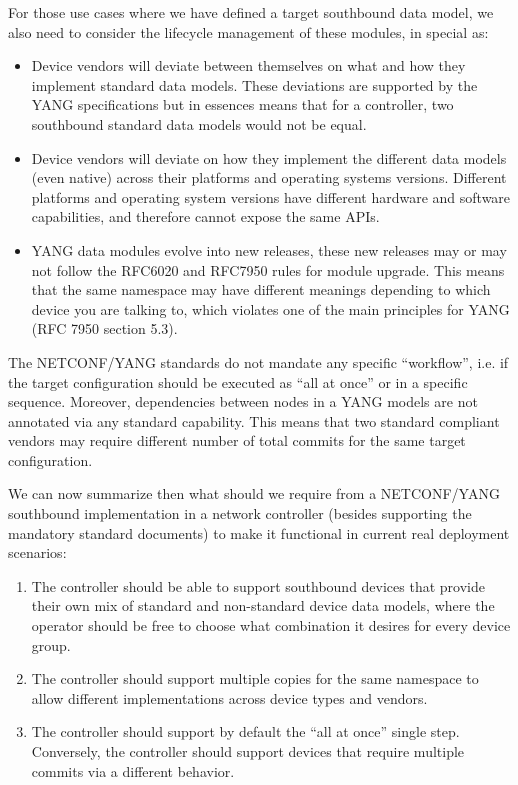 \documentclass[conference]{IEEEtran}
\begin{document}
For those use cases where we have defined a target southbound data model, we also need to consider the lifecycle management of these modules, in special as:
\begin{itemize}

\item Device vendors will deviate between themselves on what and how they implement standard data models. These deviations are supported by the YANG specifications but in essences means that for a controller, two southbound standard data models would not be equal. 

\item Device vendors will deviate on how they implement the different data models (even native) across their platforms and operating systems versions. Different platforms and operating system versions have different hardware and software capabilities, and therefore cannot expose the same APIs.

\item YANG data modules evolve into new releases, these new releases may or may not follow the RFC6020 and RFC7950 rules for module upgrade. This means that the same namespace may have different meanings depending to which device you are talking to, which violates one of the main principles for YANG (RFC 7950 section 5.3).
\end{itemize}

The NETCONF/YANG standards do not mandate any specific “workflow”, i.e. if the target configuration should be executed as “all at once” or in a specific sequence. Moreover, dependencies between nodes in a YANG models are not annotated via any standard capability. This means that two standard compliant vendors may require different number of total commits for the same target configuration.

We can now summarize then what should we require from a NETCONF/YANG southbound implementation in a network controller (besides supporting the mandatory standard documents) to make it functional in current real deployment scenarios:
\begin{enumerate}
    \item The controller should be able to support southbound devices that provide their own mix of standard and non-standard device data models, where the operator should be free to choose what combination it desires for every device group.
    \item The controller should support multiple copies for the same namespace to allow different implementations across device types and vendors.
    \item The controller should support by default the “all at once” single step. Conversely, the controller should support devices that require multiple commits via a different behavior.
\end{enumerate}
\end{document}
